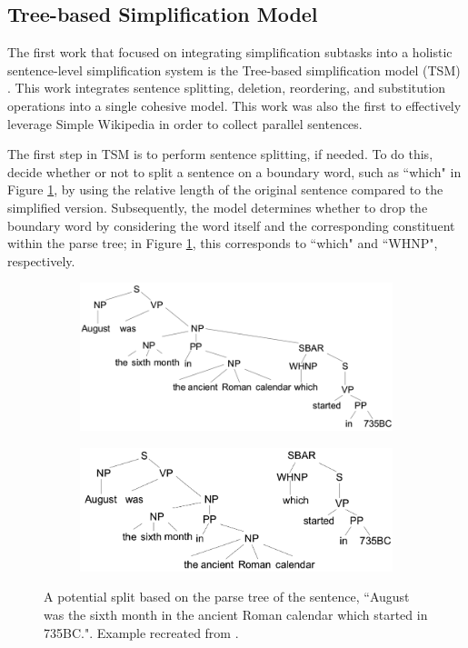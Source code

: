 \documentclass[thesis.tex]{subfiles}
\begin{document}
\subsection{Tree-based Simplification Model}

The first work that focused on integrating simplification subtasks into a holistic sentence-level simplification system is the Tree-based simplification model (TSM) \citep{zhu2010monolingual}. This work integrates sentence splitting, deletion, reordering, and substitution operations into a single cohesive model. This work was also the first to effectively leverage Simple Wikipedia in order to collect parallel sentences.

The first step in TSM is to perform sentence splitting, if needed. To do this, \cite{zhu2010monolingual} decide whether or not to split a sentence on a boundary word, such as ``which" in Figure \ref{fig:split_example}, by using the relative length of the original sentence compared to the simplified version. Subsequently, the model determines whether to drop the boundary word by considering the word itself and the corresponding constituent within the parse tree; in Figure \ref{fig:split_example}, this corresponds to ``which" and ``WHNP", respectively.

\begin{figure}
    \begin{subfigure}[c]{\textwidth}
    \centering
    \includegraphics[width=.6\textwidth]{pictures/sentence-split1.png}
    \end{subfigure}
    \newline\newline\newline
    \begin{subfigure}[c]{\textwidth}
    \centering
    \includegraphics[width=.6\textwidth]{pictures/sentence-split2.png}
    \end{subfigure}
    \caption{A potential split based on the parse tree of the sentence, ``August was the sixth month in the ancient Roman calendar which started in 735BC.". Example recreated from \cite{zhu2010monolingual}.}
    \label{fig:split_example}
\end{figure}
\end{document}
